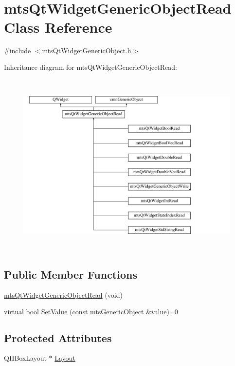 \hypertarget{classmts_qt_widget_generic_object_read}{}\section{mts\+Qt\+Widget\+Generic\+Object\+Read Class Reference}
\label{classmts_qt_widget_generic_object_read}


{\ttfamily \#include $<$mts\+Qt\+Widget\+Generic\+Object.\+h$>$}

Inheritance diagram for mts\+Qt\+Widget\+Generic\+Object\+Read\+:\begin{figure}[H]
\begin{center}
\leavevmode
\includegraphics[height=9.333333cm]{da/d99/classmts_qt_widget_generic_object_read}
\end{center}
\end{figure}
\subsection*{Public Member Functions}
\begin{DoxyCompactItemize}
\item 
\hyperlink{classmts_qt_widget_generic_object_read_aa7c657d78707c957c7887a5935b5e51f}{mts\+Qt\+Widget\+Generic\+Object\+Read} (void)
\item 
virtual bool \hyperlink{classmts_qt_widget_generic_object_read_ade3ec733d27e14609b2f95831a389658}{Set\+Value} (const \hyperlink{classmts_generic_object}{mts\+Generic\+Object} \&value)=0
\end{DoxyCompactItemize}
\subsection*{Protected Attributes}
\begin{DoxyCompactItemize}
\item 
Q\+H\+Box\+Layout $\ast$ \hyperlink{classmts_qt_widget_generic_object_read_ad10c07d124b999b3f16522a6c6eb3789}{Layout}
\end{DoxyCompactItemize}


